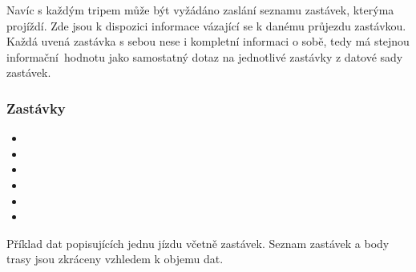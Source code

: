 Navíc s každým tripem může být vyžádáno zaslání seznamu zastávek, kterýma projíždí. Zde jsou k dispozici informace vázající se k danému průjezdu zastávkou. Každá uvená zastávka s sebou nese i kompletní informaci o sobě, tedy má stejnou informační hodnotu jako samostatný dotaz na jednotlivé zastávky z datové sady zastávek.

\subsubsection{Zastávky}

\begin{itemize}
	\item {}

	\item {}

	\item {}

	\item {}

	\item {}

	\item {}
\end{itemize}

\bigbreak

Příklad dat popisujících jednu jízdu včetně zastávek. Seznam zastávek a body trasy jsou zkráceny vzhledem k objemu dat.


